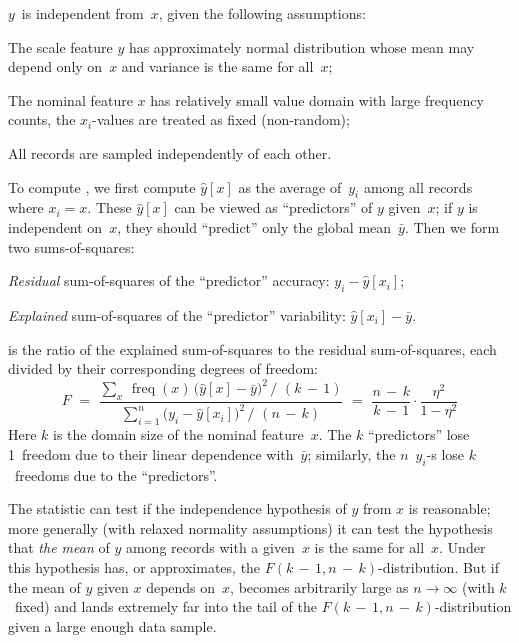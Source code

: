 \begin{Description}
$y$~is independent from~$x$, given the following assumptions:
\begin{Itemize}
\item The scale feature $y$ has approximately normal distribution whose mean
may depend only on~$x$ and variance is the same for all~$x$;
\item The nominal feature $x$ has relatively small value domain with large
frequency counts, the $x_i$-values are treated as fixed (non-random);
\item All records are sampled independently of each other.
\end{Itemize}
To compute \NameStatF{}, we first compute $\hat{y}[x]$ as the average of~$y_i$
among all records where $x_i = x$.  These $\hat{y}[x]$ can be viewed as
``predictors'' of $y$ given~$x$; if $y$ is independent on~$x$, they should
``predict'' only the global mean~$\bar{y}$.  Then we form two sums-of-squares:
\begin{Itemize}
\item \emph{Residual} sum-of-squares of the ``predictor'' accuracy: $y_i - \hat{y}[x_i]$;
\item \emph{Explained} sum-of-squares of the ``predictor'' variability: $\hat{y}[x_i] - \bar{y}$.
\end{Itemize}
\NameStatF{} is the ratio of the explained sum-of-squares to
the residual sum-of-squares, each divided by their corresponding degrees
of freedom:
\begin{equation*}
F \,\,=\,\, 
\frac{\sum_{x}\, \mathop{\mathrm{freq}}(x) \, \big(\hat{y}[x] - \bar{y}\big)^2 \,\big/\,\, (k\,{-}\,1)}%
{\sum_{i=1}^{n} \big(y_i - \hat{y}[x_i]\big)^2 \,\big/\,\, (n\,{-}\,k)} \,\,=\,\,
\frac{n\,{-}\,k}{k\,{-}\,1} \cdot \frac{\eta^2}{1 - \eta^2}
\end{equation*}
Here $k$ is the domain size of the nominal feature~$x$.  The $k$ ``predictors''
lose 1~freedom due to their linear dependence with~$\bar{y}$; similarly,
the $n$~$y_i$-s lose $k$~freedoms due to the ``predictors''.

The statistic can test if the independence hypothesis of $y$ from $x$ is reasonable;
more generally (with relaxed normality assumptions) it can test the hypothesis that
\emph{the mean} of $y$ among records with a given~$x$ is the same for all~$x$.
Under this hypothesis \NameStatF{} has, or approximates, the $F(k\,{-}\,1, n\,{-}\,k)$-distribution.
But if the mean of $y$ given $x$ depends on~$x$, \NameStatF{}
becomes arbitrarily large as $n\to\infty$ (with $k$~fixed) and lands extremely far
into the tail of the $F(k\,{-}\,1, n\,{-}\,k)$-distribution given a large enough data sample.
\end{Description}


